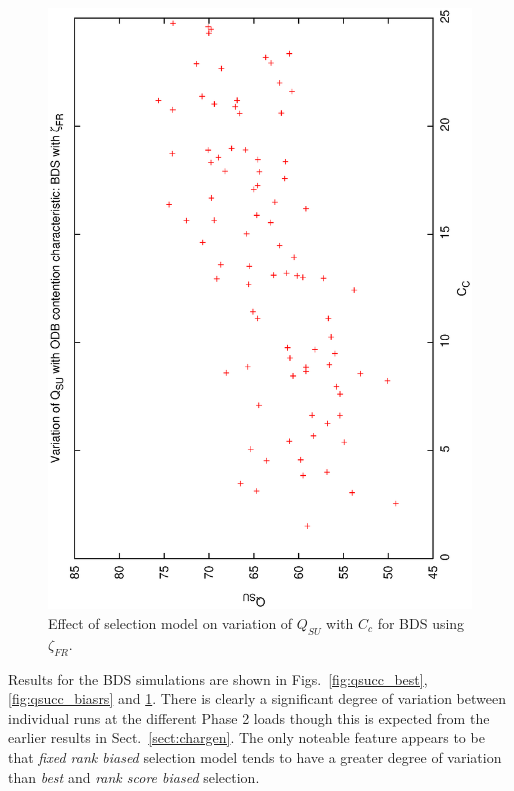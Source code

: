 \begin{figure}[h]

\begin{center}
 \includegraphics[scale=0.5, angle=-90]{figures/qsucc_biasfr.eps}
 \caption[Effect of selection model on variation of $Q_{SU}$ with $C_c$ for BDS using $\zeta_{FR}$.] 
   {Effect of selection model on variation of $Q_{SU}$ with $C_c$ for BDS using $\zeta_{FR}$.} 
\label{fig:qsucc_biasfr}
\end{center}
\end{figure}

Results for the BDS simulations are shown in Figs.~\ref{fig:qsucc_best}, \ref{fig:qsucc_biasrs} and \ref{fig:qsucc_biasfr}. There is clearly a significant degree of variation between individual runs at the different Phase 2 loads though this is expected from the earlier results in Sect.~\ref{sect:chargen}. The only noteable feature appears to be that \emph{fixed rank biased} selection model tends to have a greater degree of variation than \emph{best} and \emph{rank score biased} selection. 

